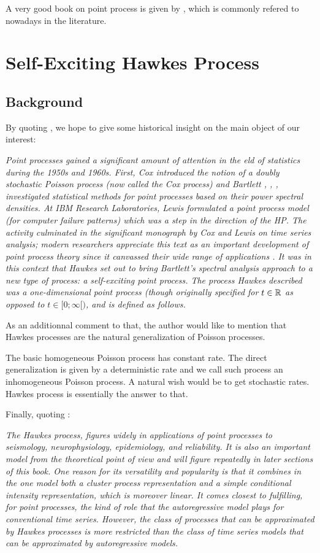 \documentclass[11pt]{book}
\begin{document}
A very good book on point process is given by \cite{daley}, which is commonly refered to nowadays in the literature.

\chapter{Self-Exciting Hawkes Process}
\section{Background}
By quoting \cite{simullaub}, we hope to give some historical insight on the main object of our interest:

\textit{Point processes gained a significant amount of attention in the eld of statistics during the 1950s and 1960s. First, Cox \cite{hphistorique1} introduced the notion of a doubly stochastic Poisson process (now called the Cox process) and Bartlett \cite{hphistorique2}, \cite{hphistorique3}, \cite{hphistorique4}, investigated statistical methods for point processes based on their power spectral densities. At IBM Research Laboratories, Lewis \cite{hphistorique5} formulated a point process model (for computer failure patterns) which was a step in the direction of the HP. The activity culminated in the significant monograph by Cox and Lewis \cite{hphistorique6} on time series analysis; modern researchers appreciate this text as an important development of point process theory since it canvassed their wide range of applications \cite{Hawkes}. It was in this context that Hawkes \cite{Hawkes} set out to bring Bartlett's spectral analysis approach to a new type of process: a self-exciting point process. The process Hawkes described was a one-dimensional point process (though originally specified for $t \in \mathbb{R}$ as opposed to $t \in [0;\infty[)$, and is defined as follows.}

As an additionnal comment to that, the author would like to mention that Hawkes processes are the natural generalization of Poisson processes. 

The basic homogeneous Poisson process has constant rate. The direct generalization is given by a deterministic rate and we call such process an inhomogeneous Poisson process. A natural wish would be to get stochastic rates. Hawkes process is essentially the answer to that.

Finally, quoting \cite{daley}:

\textit{The Hawkes process, figures widely in applications of point processes to seismology, neurophysiology, epidemiology, and reliability. It is also an important model from the theoretical point of view and will figure repeatedly in later sections of this book. One reason for its versatility and popularity is that it combines in the one model both a cluster process representation and a simple conditional intensity representation, which is moreover linear. It comes closest to fulfilling, for point processes, the kind of role that the autoregressive model plays for conventional time series. However, the class of processes that can be approximated by Hawkes processes is more restricted than the class of time series models that can be approximated by autoregressive models. }
\end{document}

